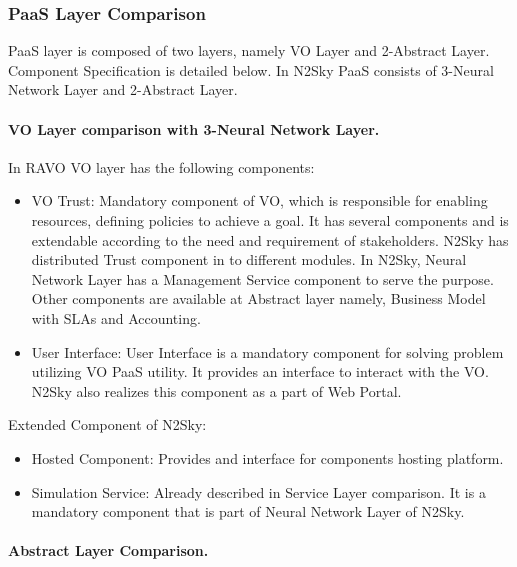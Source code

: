 \documentclass[]{article}
\begin{document}
\subsubsection{PaaS Layer Comparison}
PaaS layer is composed of two layers, namely VO Layer and 2-Abstract Layer. Component Specification is detailed below.
In N2Sky PaaS consists of 3-Neural Network Layer and 2-Abstract Layer.
\paragraph{VO Layer comparison with 3-Neural Network Layer.}
In RAVO VO layer has the following components:
\begin{itemize}
\item VO Trust: Mandatory component of VO, which is responsible for enabling resources, defining policies to achieve a goal. It has several components and is extendable according to the need and requirement of stakeholders. N2Sky has distributed Trust component in to different modules. In N2Sky, Neural Network Layer has a  Management Service component to serve the purpose. Other components are available at Abstract layer namely, Business Model with SLAs and Accounting.
\item User Interface: User Interface is a mandatory component for solving problem utilizing VO PaaS utility. It provides an interface to interact with the VO. N2Sky also realizes this component as a part of Web Portal.

\end{itemize}
Extended Component of N2Sky:
\begin{itemize}
\item Hosted Component: Provides and interface for components hosting platform.
\item Simulation Service: Already described in Service Layer comparison. It is a mandatory component that is part of Neural Network Layer of N2Sky.
\end{itemize}

 \paragraph{Abstract Layer Comparison.}\label{sub:ALCompared}
\end{document}
